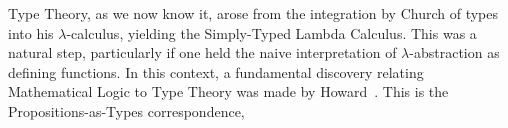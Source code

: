 \documentclass[11pt,twocolumn]{article}
\newcommand{\lcalculus}{\mbox{$\lambda$-calculus}}
\begin{document}
Type Theory, as we now know it, 
arose from the integration by Church
of types into his \lcalculus, yielding the %
Simply-Typed Lambda Calculus. %
This was a natural step, particularly if one held the naive interpretation of
\mbox{$\lambda$-abstraction} as defining functions.  
%
In this context, a fundamental discovery relating Mathematical Logic to Type
Theory was made %
by Howard~\cite{Howard1969}.
This is the Propositions-as-Types correspondence, %
\end{document}
